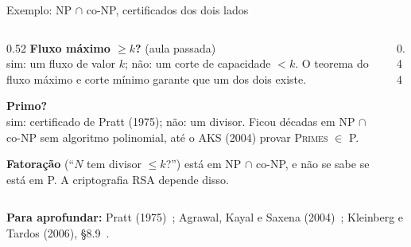 \documentclass[aspectratio=169,xcolor=table]{beamer}
\newcommand{\fonte}[1]{%
  \vfill
  {\tiny\color{gray!55!black}\textbf{Para aprofundar:} #1\par}%
}
\newcommand{\prob}[1]{\textsc{#1}}
\begin{document}
\begin{frame}{Exemplo: NP $\cap$ co-NP, certificados dos dois lados}
  \begin{columns}[T]
    \begin{column}{0.52\textwidth}
      \scriptsize
      \textbf{Fluxo máximo $\ge k$?} (aula passada)\\
      sim: um fluxo de valor $k$; não: um corte de capacidade $< k$. O teorema do fluxo máximo
      e corte mínimo garante que um dos dois existe.
      \medskip

      \textbf{Primo?}\\
      sim: certificado de Pratt (1975); não: um divisor. Ficou décadas em NP $\cap$ co-NP sem
      algoritmo polinomial, até o AKS (2004) provar \prob{Primes} $\in$ P.
      \medskip

      \textbf{Fatoração} (``$N$ tem divisor $\le k$?'') está em NP $\cap$ co-NP, e não se sabe
      se está em P. A criptografia RSA depende disso.
    \end{column}
    \begin{column}{0.44\textwidth}
      \begin{center}
      \end{center}
    \end{column}
  \end{columns}
  \fonte{Pratt (1975)~\cite{pratt1975every}; Agrawal, Kayal e Saxena (2004)~\cite{agrawal2004primes};
    Kleinberg e Tardos (2006), \S 8.9~\cite{kleinberg2006algorithm}.}
\end{frame}
\end{document}
